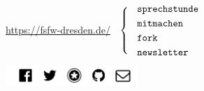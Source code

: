\documentclass{beamer}
\begin{document}
\begin{frame}

  \onslide<+->


  \begin{center}
    \url{https://fsfw-dresden.de/}
    $\;\;\left\{\;\;\text{
        \parbox{2.3cm}{
          \texttt{sprechstunde}\\[1mm]
          \texttt{mitmachen}\\[1mm]
          \texttt{fork}\\[1mm]
          \texttt{newsletter}
        }}
    \right.$

    \vspace*{2\bigskipamount}

    \includegraphics[width=50mm]{fsfw-netzwerke}
  \end{center}

\end{frame}
\end{document}
